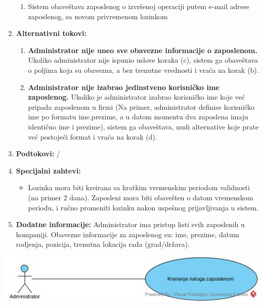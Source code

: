 \documentclass[a4paper]{article}
\begin{document}
\begin{enumerate}
\begin{enumerate}
            \item Sistem obaveštava zaposlenog o izvršenoj operaciji putem e-mail adrese zaposlenog, sa novom privremenom lozinkom
        \end{enumerate}
    \item \textbf{Alternativni tokovi:}
        \begin{enumerate}
            \item \textbf{Administrator nije uneo sve obavezne informacije o zaposlenom.} Ukoliko administrator nije ispunio uslove koraka (c), sistem ga obaveštava o poljima koja su obavezna, a bez trenutne vrednosti i vraća na korak (b).
            \item \textbf{Administrator nije izabrao jedinstveno korisničko ime zaposlenog.} Ukoliko je administrator izabrao korisničko ime koje već pripada zaposlenom u firmi (Na primer, administrator definise korisničko ime po formatu ime.prezime, a u datom momentu dva zaposlena imaju identično ime i prezime), sistem ga obaveštava, nudi alternative koje prate već postojeći format i vraća na korak (d).
        \end{enumerate}
    \item \textbf{Podtokovi:} /
    \item \textbf{Specijalni zahtevi:}
        \begin{itemize}
            \item Lozinka mora biti kreirana sa kratkim vremenskim periodom validnosti (na primer 2 dana). Zaposleni mora biti obavešten o datom vremenskom periodu, i ručno promeniti lozinku nakon uspešnog prijavljivanja u sistem.
        \end{itemize}
    \item \textbf{Dodatne informacije:} Administrator ima pristup listi svih zaposlenih u kompaniji. Obavezne informacije za zaposlenog su: ime, prezime, datum rodjenja, pozicija, trenutna lokacija rada (grad/država).
\end{enumerate}

\includegraphics[scale=0.5]{UML/SlucajUpotrebe_KreiranjeNalogaZaposlenom.jpg}
\end{document}

